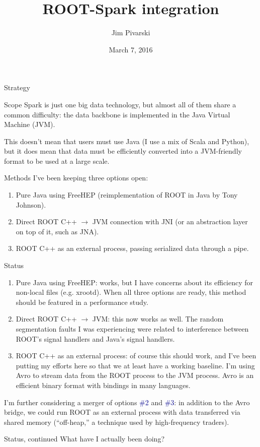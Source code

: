 \documentclass{beamer}
\title[2016-03-07-spark]{ROOT-Spark integration}
\author{Jim Pivarski}
\institute{Princeton Univeristy --- DIANA}
\date{March 7, 2016}
\begin{document}
\begin{frame}
  \titlepage
\end{frame}


\begin{frame}{Strategy}
\begin{block}{Scope}
Spark is just one big data technology, but almost all of them share a common difficulty: the data backbone is implemented in the Java Virtual Machine (JVM).

\vspace{0.2 cm}
This doesn't mean that users must use Java (I use a mix of Scala and Python), but it does mean that data must be efficiently converted into a JVM-friendly format to be used at a large scale.
\end{block}

\begin{block}{Methods}
I've been keeping three options open:
\begin{enumerate}
\item Pure Java using FreeHEP (reimplementation of ROOT in Java by Tony Johnson).
\item Direct ROOT C++ $\to$ JVM connection with JNI (or an abstraction layer on top of it, such as JNA).
\item ROOT C++ as an external process, passing serialized data through a pipe.
\end{enumerate}
\end{block}
\end{frame}

\begin{frame}{Status}
\begin{enumerate}
\item Pure Java using FreeHEP: works, but I have concerns about its efficiency for non-local files (e.g. xrootd). When all three options are ready, this method should be featured in a performance study.

\item Direct ROOT C++ $\to$ JVM: this now works as well. The random segmentation faults I was experiencing were related to interference between ROOT's signal handlers and Java's signal handlers.

\item ROOT C++ as an external process: of course this should work, and I've been putting my efforts here so that we at least have a working baseline. I'm using Avro to stream data from the ROOT process to the JVM process. Avro is an efficient binary format with bindings in many languages.
\end{enumerate}

I'm further considering a merger of options \textcolor{darkblue}{\#2} and \textcolor{darkblue}{\#3}: in addition to the Avro bridge, we could run ROOT as an external process with data transferred via shared memory (``off-heap,'' a technique used by high-frequency traders).
\end{frame}

\begin{frame}{Status, continued}
What have I actually been doing?

\vspace{0.2 cm}


\end{frame}
\end{document}

